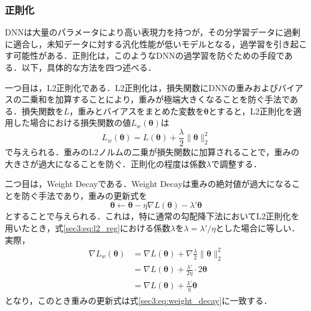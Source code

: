 \documentclass[12pt]{jarticle}
\numberwithin{equation}{section}    %
\numberwithin{figure}{section}      %
\numberwithin{table}{section}      %
\begin{document}
\subsubsection{正則化}
DNNは大量のパラメータにより高い表現力を持つが，その分学習データに過剰に適合し，未知データに対する汎化性能が低いモデルとなる，過学習を引き起こす可能性がある．正則化は，このようなDNNの過学習を防ぐための手段である．以下，具体的な方法を四つ述べる．

一つ目は，L2正則化である．L2正則化は，損失関数にDNNの重みおよびバイアスの二乗和を加算することにより，重みが極端大きくなることを防ぐ手法である．損失関数を$L$，重みとバイアスをまとめた変数を$\bm{\theta}$とすると，L2正則化を適用した場合における損失関数の値$L_{w}(\bm{\theta})$は
\begin{equation}
    \label{sec3:eq:l2_reg}
    L_{w}(\bm{\theta}) = L(\bm{\theta}) + \frac{\lambda}{2} \|\bm{\theta}\|_{2}^{2}
\end{equation}
で与えられる．重みのL2ノルムの二乗が損失関数に加算されることで，重みの大きさが過大になることを防ぐ．正則化の程度は係数$\lambda$で調整する．

二つ目は，Weight Decayである．Weight Decayは重みの絶対値が過大になることを防ぐ手法であり，重みの更新式を
\begin{equation}
    \label{sec3:eq:weight_decay}
    \bm{\theta} \leftarrow \bm{\theta} - \eta \nabla L(\bm{\theta}) - \lambda' \bm{\theta}
\end{equation}
とすることで与えられる．これは，特に通常の勾配降下法においてL2正則化を用いたとき，式\eqref{sec3:eq:l2_reg}における係数$\lambda$を$\lambda = \lambda' / \eta$とした場合に等しい\cite{loshchilov2017decoupled}．実際，
\begin{align}
    \nabla L_{w}(\bm{\theta}) & = \nabla L(\bm{\theta}) + \nabla \frac{\lambda}{2} \|\bm{\theta}\|_{2}^{2} \\
                              & = \nabla L(\bm{\theta}) + \frac{\lambda'}{2\eta} \cdot 2\bm{\theta}        \\
                              & = \nabla L(\bm{\theta}) + \frac{\lambda'}{\eta} \bm{\theta}
\end{align}
となり，このとき重みの更新式は式\eqref{sec3:eq:weight_decay}に一致する．
\end{document}
